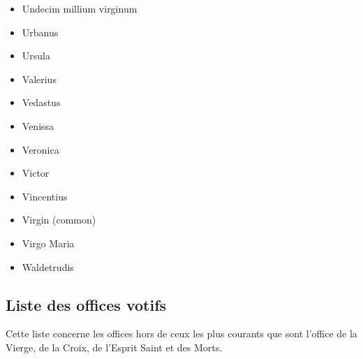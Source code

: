 \documentclass[a4paper,12pt,twoside]{book}
\begin{document}
\begin{itemize}
\item Undecim millium virginum
\item Urbanus
\item Ursula
\item Valerius
\item Vedastus
\item Venissa
\item Veronica
\item Victor
\item Vincentius
\item Virgin (common)
\item Virgo Maria
\item Waldetrudis
	\end{itemize}
	
	\subsection{Liste des offices votifs}
	
	Cette liste concerne les offices hors de ceux les plus courants que sont l'office de la Vierge, de la Croix, de l'Esprit Saint et des Morts. 
	
\end{document}
